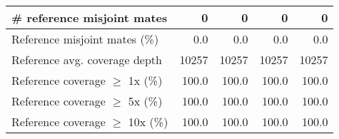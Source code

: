 \documentclass[12pt,a4paper]{article}
\begin{document}
\begin{table}[ht]
\begin{center}
\begin{tabular}{|l*{4}{|r}|}
\# reference misjoint mates & 0 & 0 & 0 & 0 \\ \hline
Reference misjoint mates (\%) & 0.0 & 0.0 & 0.0 & 0.0 \\ \hline
Reference avg. coverage depth & 10257 & 10257 & 10257 & 10257 \\ \hline
Reference coverage $\geq$ 1x (\%) & 100.0 & 100.0 & 100.0 & 100.0 \\ \hline
Reference coverage $\geq$ 5x (\%) & 100.0 & 100.0 & 100.0 & 100.0 \\ \hline
Reference coverage $\geq$ 10x (\%) & 100.0 & 100.0 & 100.0 & 100.0 \\ \hline
\end{tabular}
\end{center}
\end{table}
\end{document}
